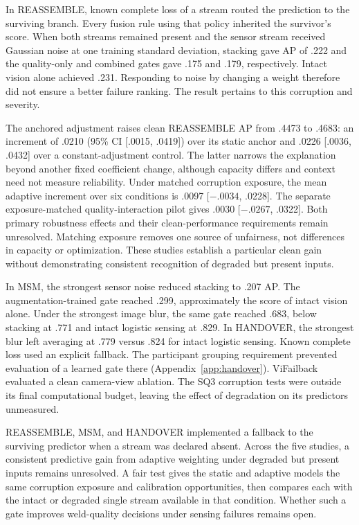 In REASSEMBLE, known complete loss of a stream routed the prediction to the surviving
branch. Every fusion rule using that policy inherited the survivor's score. When both
streams remained present and the sensor stream received Gaussian noise at one training
standard deviation, stacking gave AP of .222 and the quality-only and combined gates
gave .175 and .179, respectively. Intact vision alone achieved .231. Responding to noise
by changing a weight therefore did not ensure a better failure ranking. The result
pertains to this corruption and severity.

The anchored adjustment raises clean REASSEMBLE AP from .4473 to .4683: an increment of
.0210 (95\% CI [.0015, .0419]) over its static anchor and .0226 [.0036, .0432] over a
constant-adjustment control. The latter narrows the explanation beyond another fixed
coefficient change, although capacity differs and context need not measure reliability.
Under matched corruption exposure, the mean adaptive increment over six conditions is
.0097 [$-.0034$, .0228]. The separate exposure-matched quality-interaction pilot gives
.0030 [$-.0267$, .0322]. Both primary robustness effects and their clean-performance
requirements remain unresolved. Matching exposure removes one source of unfairness, not
differences in capacity or optimization. These studies establish a particular clean gain
without demonstrating consistent recognition of degraded but present inputs.

In MSM, the strongest sensor noise reduced stacking to .207 AP. The augmentation-trained
gate reached .299, approximately the score of intact vision alone. Under the strongest
image blur, the same gate reached .683, below stacking at .771 and intact logistic
sensing at .829. In HANDOVER, the strongest blur left averaging at .779 versus .824 for
intact logistic sensing. Known complete loss used an explicit fallback. The participant
grouping requirement prevented evaluation of a learned gate there
(Appendix~\ref{app:handover}). ViFailback evaluated a clean camera-view ablation. The
SQ3 corruption tests were outside its final computational budget, leaving the effect of
degradation on its predictors unmeasured.

REASSEMBLE, MSM, and HANDOVER implemented a fallback to the surviving predictor when a
stream was declared absent. Across the five studies, a consistent predictive gain from
adaptive weighting under degraded but present inputs remains unresolved. A fair test
gives the static and adaptive models the same corruption exposure and calibration
opportunities, then compares each with the intact or degraded single stream available in
that condition. Whether such a gate improves weld-quality decisions under sensing
failures remains open.

